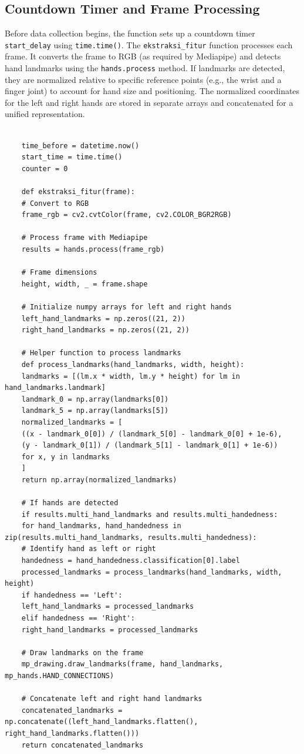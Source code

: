 \subsection{Countdown Timer and Frame Processing}
Before data collection begins, the function sets up a countdown timer \verb|start_delay| using \verb|time.time()|. The \verb|ekstraksi_fitur| function processes each frame. It converts the frame to RGB (as required by Mediapipe) and detects hand landmarks using the \verb|hands.process| method. If landmarks are detected, they are normalized relative to specific reference points (e.g., the wrist and a finger joint) to account for hand size and positioning. The normalized coordinates for the left and right hands are stored in separate arrays and concatenated for a unified representation.\\

\begin{lstlisting}
	
	time_before = datetime.now()
	start_time = time.time()
	counter = 0
	
	def ekstraksi_fitur(frame):
	# Convert to RGB
	frame_rgb = cv2.cvtColor(frame, cv2.COLOR_BGR2RGB)
	
	# Process frame with Mediapipe
	results = hands.process(frame_rgb)
	
	# Frame dimensions
	height, width, _ = frame.shape
	
	# Initialize numpy arrays for left and right hands
	left_hand_landmarks = np.zeros((21, 2))
	right_hand_landmarks = np.zeros((21, 2))
	
	# Helper function to process landmarks
	def process_landmarks(hand_landmarks, width, height):
	landmarks = [(lm.x * width, lm.y * height) for lm in hand_landmarks.landmark]
	landmark_0 = np.array(landmarks[0])
	landmark_5 = np.array(landmarks[5])
	normalized_landmarks = [
	((x - landmark_0[0]) / (landmark_5[0] - landmark_0[0] + 1e-6),
	(y - landmark_0[1]) / (landmark_5[1] - landmark_0[1] + 1e-6))
	for x, y in landmarks
	]
	return np.array(normalized_landmarks)
	
	# If hands are detected
	if results.multi_hand_landmarks and results.multi_handedness:
	for hand_landmarks, hand_handedness in zip(results.multi_hand_landmarks, results.multi_handedness):
	# Identify hand as left or right
	handedness = hand_handedness.classification[0].label
	processed_landmarks = process_landmarks(hand_landmarks, width, height)
	if handedness == 'Left':
	left_hand_landmarks = processed_landmarks
	elif handedness == 'Right':
	right_hand_landmarks = processed_landmarks
	
	# Draw landmarks on the frame
	mp_drawing.draw_landmarks(frame, hand_landmarks, mp_hands.HAND_CONNECTIONS)
	
	# Concatenate left and right hand landmarks
	concatenated_landmarks = np.concatenate((left_hand_landmarks.flatten(), right_hand_landmarks.flatten()))
	return concatenated_landmarks
\end{lstlisting}

